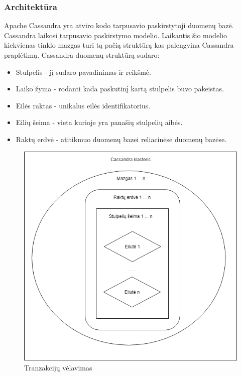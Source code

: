 \documentclass{VUMIFPSkursinis}
\begin{document}
\subsubsection{Architektūra}
Apache Cassandra yra atviro kodo tarpusavio paskirstytoji duomenų bazė. Cassandra laikosi tarpusavio paskirstymo modelio. Laikantis šio modelio kiekvienas tinklo mazgas turi tą pačią struktūrą kas palengvina Cassandra praplėtimą. 
\linebreak
Cassandra duomenų struktūrą sudaro: 
\begin{itemize}
\item{Stulpelis - jį sudaro pavadinimas ir reikšmė.}
\item{Laiko žyma - rodanti kada paskutinį kartą stulpelis buvo pakeistas.}
\item{Eilės raktas - unikalus eilės identifikatorius.}
\item{Eilių šeima - vieta kurioje yra panašių stulpelių aibės.}
\item{Raktų erdvė - atitikmuo duomenų bazei reliacinėse duomenų bazėse.}
\end{itemize}
\begin{figure}[H]
\centering
\includegraphics[scale=0.5]{img/CasArch}
\caption{Tranzakcijų vėlavimas} %
\label{img:mlp}
\end{figure}
\end{document}
